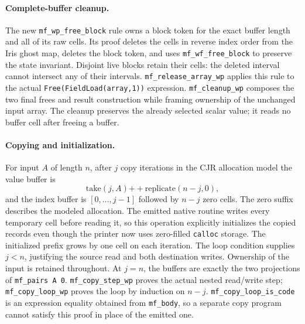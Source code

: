 \paragraph{Complete-buffer cleanup.}
The new \texttt{mf\_wp\_free\_block} rule owns a block token for the exact
buffer length and all of its raw cells. Its proof deletes the cells in
reverse index order from the Iris ghost map, deletes the block token,
and uses \texttt{mf\_wf\_free\_block} to preserve the state invariant.
Disjoint live blocks retain their cells: the deleted interval cannot
intersect any of their intervals. \texttt{mf\_release\_array\_wp} applies
this rule to the actual \texttt{Free(FieldLoad(array,1))} expression.
\texttt{mf\_cleanup\_wp} composes the two final frees and result
construction while framing ownership of the unchanged input array.
The cleanup preserves the already selected scalar value; it reads no
buffer cell after freeing a buffer.

\paragraph{Copying and initialization.}
For input $A$ of length $n$, after $j$ copy iterations in the CJR
allocation model the value buffer is
\[
 \mathrm{take}(j,A)\mathbin{+\!+}\mathrm{replicate}(n-j,0),
\]
and the index buffer is $[0,\ldots,j-1]$ followed by $n-j$ zero cells.
The zero suffix describes the modeled allocation. The emitted native
routine writes every temporary cell before reading it, so this operation
explicitly initializes the copied records even though the printer now
uses zero-filled \texttt{calloc} storage.
The initialized prefix grows by one cell on each iteration. The loop
condition supplies $j<n$, justifying the source read and both destination
writes. Ownership of the input is retained throughout. At $j=n$, the
buffers are exactly the two projections of \texttt{mf\_pairs A 0}.
\texttt{mf\_copy\_step\_wp} proves the actual nested read/write step;
\texttt{mf\_copy\_loop\_wp} proves the loop by induction on $n-j$.
\texttt{mf\_copy\_loop\_is\_code} is an expression equality obtained from
\texttt{mf\_body}, so a separate copy program cannot satisfy this proof
in place of the emitted one.

